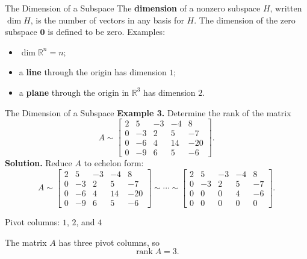 \documentclass[aspectratio=169]{beamer}
\newcommand{\R}{\mathbb{R}}
\newcommand{\vect}[1]{\mathbf{#1}}
\newcommand{\Col}{\operatorname{Col}}
\newcommand{\Nul}{\operatorname{Nul}}
\newcommand{\rank}{\operatorname{rank}}
\begin{document}
\begin{frame}{The Dimension of a Subspace}
The \textbf{dimension} of a nonzero subspace $H$, written $\dim H$, is the number of vectors in any basis for $H$. The dimension of the zero subspace {$\vect 0$} is defined to be zero.
Examples:
\begin{itemize}
  \item $\dim\R^n=n$;
  \item a \textbf{line} through the origin has dimension $1$;
  \item a \textbf{plane} through the origin in $\R^3$ has dimension $2$.
\end{itemize}
\end{frame}



\begin{frame}{The Dimension of a Subspace}
\small
\setlength{\abovedisplayskip}{4pt}
\setlength{\belowdisplayskip}{4pt}
\textbf{Example 3.} Determine the rank of the matrix
\[
A\sim
\begin{bmatrix}
2&5&-3&-4&8\\
0&-3&2&5&-7\\
0&-6&4&14&-20\\
0&-9&6&5&-6
\end{bmatrix}.
\]
\textbf{Solution.} Reduce $A$ to echelon form:
\[
A\sim
\begin{bmatrix}
2&5&-3&-4&8\\
0&-3&2&5&-7\\
0&-6&4&14&-20\\
0&-9&6&5&-6
\end{bmatrix}
\sim\cdots\sim
\begin{bmatrix}
2&5&-3&-4&8\\
0&-3&2&5&-7\\
0&0&0&4&-6\\
0&0&0&0&0
\end{bmatrix}.
\]
\begin{center}
\textcolor{lectureblue}{Pivot columns: $1$, $2$, and $4$}
\end{center}
The matrix $A$ has three pivot columns, so
\[
\boxed{\rank A=3}.
\]
\end{frame}
\end{document}
